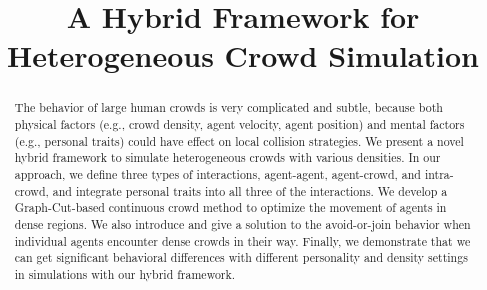 \documentclass[conference]{acmsiggraph}
\title{A Hybrid Framework for Heterogeneous Crowd Simulation}
\author{Paper ID 116 Author One \\
		\thanks {anonymous@anonymous.edu} \\ Anonymous Univeristy
		\and
		Author Two \\
		\thanks {anonymous@anonymous.edu} \\ Anonymous Univeristy
		\and
		More Authors \\
		\thanks {anonymous@anonymous.edu} \\ Anonymous Univeristy
		\and}
\begin{document}

\maketitle

\begin{abstract}
The behavior of large human crowds is very complicated and subtle, because both physical factors (e.g., crowd density, agent velocity, agent position) and mental factors (e.g., personal traits) could have effect on local collision strategies. We present a novel hybrid framework to simulate heterogeneous crowds with various densities. In our approach, we define three types of interactions, agent-agent, agent-crowd, and intra-crowd, and integrate personal traits into all three of the interactions. We develop a Graph-Cut-based continuous crowd method to optimize the movement of agents in dense regions. We also introduce and give a solution to the avoid-or-join behavior when individual agents encounter dense crowds in their way. Finally, we demonstrate that we can get significant behavioral differences with different personality and density settings in simulations with our hybrid framework.

\end{abstract}

\begin{CRcatlist}
\end{CRcatlist}

\keywordlist


\TOGlinkslist


\copyrightspace
\end{document}
